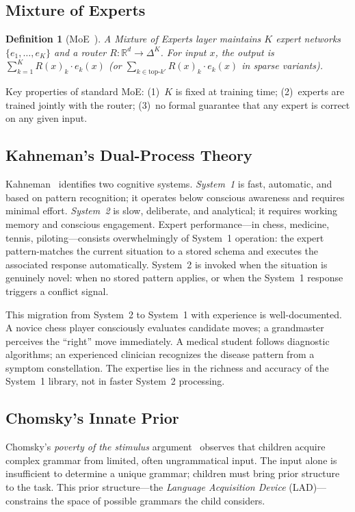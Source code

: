 \documentclass[11pt]{article}
\newtheorem{definition}{Definition}
\begin{document}
\subsection{Mixture of Experts}

\begin{definition}[MoE~\cite{shazeer2017}]
A \emph{Mixture of Experts} layer maintains $K$ expert networks
$\{e_1,\ldots,e_K\}$ and a router $R: \mathbb{R}^d \to \Delta^K$.  For
input $x$, the output is $\sum_{k=1}^K R(x)_k \cdot e_k(x)$ (or
$\sum_{k \in \text{top-}k'} R(x)_k \cdot e_k(x)$ in sparse variants).
\end{definition}

Key properties of standard MoE: (1)~$K$ is fixed at training time; (2)~experts
are trained jointly with the router; (3)~no formal guarantee that any expert is
correct on any given input.

\subsection{Kahneman's Dual-Process Theory}

Kahneman~\cite{kahneman2011} identifies two cognitive systems.
\emph{System~1} is fast, automatic, and based on pattern recognition;
it operates below conscious awareness and requires minimal effort.
\emph{System~2} is slow, deliberate, and analytical; it requires working
memory and conscious engagement.  Expert performance---in chess, medicine,
tennis, piloting---consists overwhelmingly of System~1 operation:
the expert pattern-matches the current situation to a stored schema and
executes the associated response automatically.  System~2 is invoked when
the situation is genuinely novel: when no stored pattern applies, or when
the System~1 response triggers a conflict signal.

This migration from System~2 to System~1 with experience is well-documented.
A novice chess player consciously evaluates candidate moves; a grandmaster
perceives the ``right'' move immediately.  A medical student follows diagnostic
algorithms; an experienced clinician recognizes the disease pattern from a
symptom constellation.  The expertise lies in the richness and accuracy of
the System~1 library, not in faster System~2 processing.

\subsection{Chomsky's Innate Prior}

Chomsky's \emph{poverty of the stimulus} argument~\cite{chomsky1965} observes
that children acquire complex grammar from limited, often ungrammatical input.
The input alone is insufficient to determine a unique grammar; children must
bring prior structure to the task.  This prior structure---the \emph{Language
Acquisition Device} (LAD)---constrains the space of possible grammars the child
considers.
\end{document}
